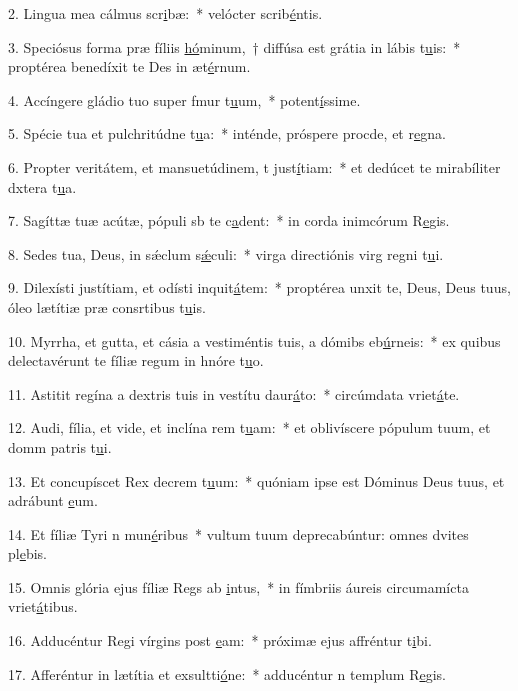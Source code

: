 2. Lingua mea cálmus scr\uline{i}bæ:~* velócter scrib\uline{é}ntis.\par 
3. Speciósus forma præ fíliis \uline{hó}minum,~† diffúsa est grátia in lábis t\uline{u}is:~* proptérea benedíxit te Des in æt\uline{é}rnum.\par 
4. Accíngere gládio tuo super fmur t\uline{u}um,~* potent\uline{í}ssime.\par 
5. Spécie tua et pulchritúdne t\uline{u}a:~* inténde, próspere procde, et r\uline{e}gna.\par 
6. Propter veritátem, et mansuetúdinem, t just\uline{í}tiam:~* et dedúcet te mirabíliter dxtera t\uline{u}a.\par 
7. Sagíttæ tuæ acútæ, pópuli sb te c\uline{a}dent:~* in corda inimcórum R\uline{e}gis.\par 
8. Sedes tua, Deus, in sǽclum s\uline{ǽ}culi:~* virga directiónis virg regni t\uline{u}i.\par 
9. Dilexísti justítiam, et odísti inquit\uline{á}tem:~* proptérea unxit te, Deus, Deus tuus, óleo lætítiæ præ consrtibus t\uline{u}is.\par 
10. Myrrha, et gutta, et cásia a vestiméntis tuis, a dómibs eb\uline{ú}rneis:~* ex quibus delectavérunt te fíliæ regum in hnóre t\uline{u}o.\par 
11. Astitit regína a dextris tuis in vestítu daur\uline{á}to:~* circúmdata vriet\uline{á}te.\par 
12. Audi, fília, et vide, et inclína rem t\uline{u}am:~* et oblivíscere pópulum tuum, et domm patris t\uline{u}i.\par 
13. Et concupíscet Rex decrem t\uline{u}um:~* quóniam ipse est Dóminus Deus tuus, et adrábunt \uline{e}um.\par 
14. Et fíliæ Tyri n mun\uline{é}ribus~* vultum tuum deprecabúntur: omnes dvites pl\uline{e}bis.\par 
15. Omnis glória ejus fíliæ Regs ab \uline{i}ntus,~* in fímbriis áureis circumamícta vriet\uline{á}tibus.\par 
16. Adducéntur Regi vírgins post \uline{e}am:~* próximæ ejus affréntur t\uline{i}bi.\par 
17. Afferéntur in lætítia et exsultti\uline{ó}ne:~* adducéntur n templum R\uline{e}gis.\par 
